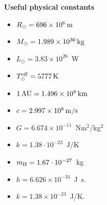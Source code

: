 \documentclass[12pt]{article}
\begin{document}
{\bf Useful physical constants}
\begin{itemize}
  \item $R_{\odot} = 696 \times 10^6\,{\rm m}$
  \item $M_{\odot} = 1.989 \times 10^{30}\,{\rm kg}$
  \item $L_{\odot} = 3.83 \times 10^{26}$~W
  \item $T^{\rm eff}_{\odot} = 5777\,{\rm K}$
  \item $1\,{\rm AU} = 1.496 \times 10^8\,{\rm km}$
  \item $c = 2.997 \times 10^8\,{\rm m/s}$
  \item $G = 6.674 \times 10^{-11}$~Nm$^2$/kg$^2$
  \item $k = 1.38\cdot10^{-23}$~J/K
  \item $m_{\rm H} = 1.67\cdot10^{-27}$~kg
  \item $h=6.626 \times 10^{-34}$~J~s.
  \item $k=1.38 \times 10^{-23}$~J/K.
\end{itemize}
\end{document}
